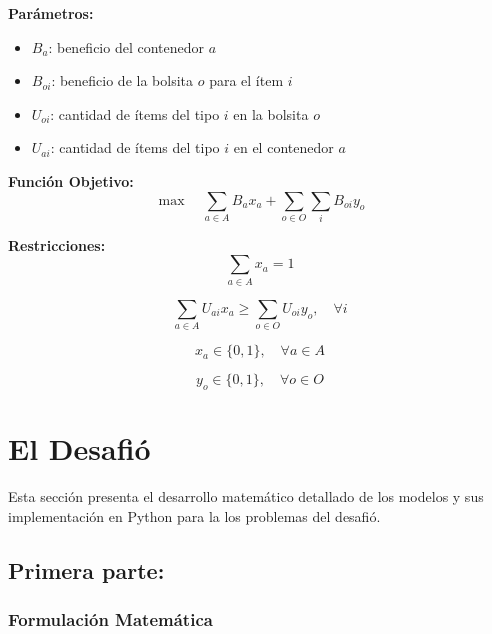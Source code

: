 \documentclass[a4paper,12pt]{article}
\begin{document}
\textbf{Parámetros:}
\begin{itemize}
    \item $B_a$: beneficio del contenedor $a$
    \item $B_{oi}$: beneficio de la bolsita $o$ para el ítem $i$
    \item $U_{oi}$: cantidad de ítems del tipo $i$ en la bolsita $o$
    \item $U_{ai}$: cantidad de ítems del tipo $i$ en el contenedor $a$
\end{itemize}

\textbf{Función Objetivo:}
\begin{equation}
\max \quad \sum_{a \in A} B_a x_a + \sum_{o \in O} \sum_{i} B_{oi} y_o
\end{equation}

\textbf{Restricciones:}
\begin{equation}
\sum_{a \in A} x_a = 1
\end{equation}

\begin{equation}
\sum_{a \in A} U_{ai} x_a \geq \sum_{o \in O} U_{oi} y_o, \quad \forall i
\end{equation}

\begin{equation}
x_a \in \{0,1\}, \quad \forall a \in A
\end{equation}

\begin{equation}
y_o \in \{0,1\}, \quad \forall o \in O
\end{equation}

\clearpage

\section{El Desafió}

Esta sección presenta el desarrollo matemático detallado de los modelos y sus implementación en Python para la los problemas del desafió.

\subsection{Primera parte:}
\label{sec:variante1}

\subsubsection{Formulación Matemática}
\end{document}
